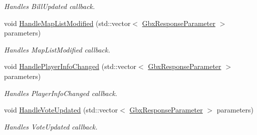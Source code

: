 \begin{DoxyCompactItemize}
\begin{DoxyCompactList}\small\item\em Handles Bill\-Updated callback. \end{DoxyCompactList}\item 
void \hyperlink{classCallBackManager_a5f8553720ce21a9d55dd6e5cce21fcc2}{Handle\-Map\-List\-Modified} (std\-::vector$<$ \hyperlink{classGbxResponseParameter}{Gbx\-Response\-Parameter} $>$ parameters)
\begin{DoxyCompactList}\small\item\em Handles Map\-List\-Modified callback. \end{DoxyCompactList}\item 
void \hyperlink{classCallBackManager_a0373533b769d15667a66c1607369cfff}{Handle\-Player\-Info\-Changed} (std\-::vector$<$ \hyperlink{classGbxResponseParameter}{Gbx\-Response\-Parameter} $>$ parameters)
\begin{DoxyCompactList}\small\item\em Handles Player\-Info\-Changed callback. \end{DoxyCompactList}\item 
void \hyperlink{classCallBackManager_a7af7f38c8e0994fcbba2de59dee1921f}{Handle\-Vote\-Updated} (std\-::vector$<$ \hyperlink{classGbxResponseParameter}{Gbx\-Response\-Parameter} $>$ parameters)
\begin{DoxyCompactList}\small\item\em Handles Vote\-Updated callback. \end{DoxyCompactList}\end{DoxyCompactItemize}
